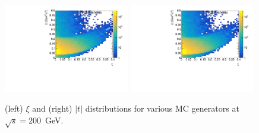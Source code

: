 \begin{figure}[h!]
	\centering
	\includegraphics[width=0.49\textwidth, page=14]{chapters/dataSampleSTAR/img/true.pdf}
	\includegraphics[width=0.49\textwidth, page=13]{chapters/dataSampleSTAR/img/true.pdf}
	\caption{(left) $\xi$ and  (right) $|t|$ distributions for various MC generators at $\sqrt{s} = 200$~GeV.}
	\label{fig:STARtrueMC}
\end{figure}
